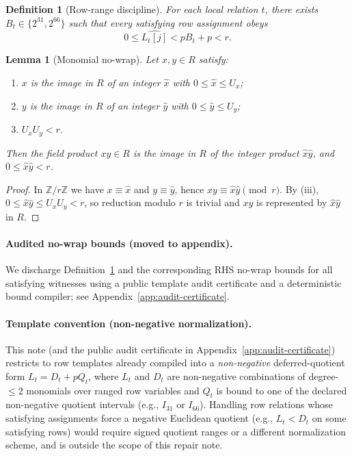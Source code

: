 ﻿\documentclass[11pt]{article}
\newtheorem{lemma}[theorem]{Lemma}
\newtheorem{definition}[theorem]{Definition}
\newcommand{\Z}{\mathbb{Z}}
\newcommand{\wt}[1]{\widehat{#1}}
\begin{document}
\begin{definition}[Row-range discipline]
\label{def:row-range-discipline}
For each local relation \(t\), there exists \(B_t\in\{2^{31},2^{66}\}\) such that
every satisfying row assignment obeys
\[
0 \le \wt{L_t[j]} < pB_t + p < r.
\]
\end{definition}

\begin{lemma}[Monomial no-wrap]
\label{lem:monomial-nowrap}
Let \(x,y\in R\) satisfy:
\begin{enumerate}[label=(\roman*),leftmargin=2em]
    \item \(x\) is the image in \(R\) of an integer \(\wt{x}\) with
    \(0\le \wt{x}\le U_x\);
    \item \(y\) is the image in \(R\) of an integer \(\wt{y}\) with
    \(0\le \wt{y}\le U_y\);
    \item \(U_xU_y<r\).
\end{enumerate}
Then the field product \(xy\in R\) is the image in \(R\) of the integer product
\(\wt{x}\wt{y}\), and \(0\le \wt{x}\wt{y}<r\).
\end{lemma}

\begin{proof}
In \(\Z/r\Z\) we have \(x\equiv \wt{x}\) and \(y\equiv \wt{y}\), hence
\(xy\equiv \wt{x}\wt{y}\pmod r\). By (iii),
\(0\le \wt{x}\wt{y}\le U_xU_y<r\), so reduction modulo \(r\) is trivial and
\(xy\) is represented by \(\wt{x}\wt{y}\) in \(R\).
\end{proof}

\paragraph{Audited no-wrap bounds (moved to appendix).}
We discharge Definition~\ref{def:row-range-discipline} and the corresponding
RHS no-wrap bounds for all satisfying witnesses using a public template audit
certificate and a deterministic bound compiler; see
Appendix~\ref{app:audit-certificate}.

\paragraph{Template convention (non-negative normalization).}
This note (and the public audit certificate in Appendix~\ref{app:audit-certificate})
restricts to row templates already compiled into a \emph{non-negative} deferred-quotient
form \(L_t = D_t + pQ_t\), where \(L_t\) and \(D_t\) are non-negative combinations
of degree-\(\le 2\) monomials over ranged row variables and \(Q_t\) is bound to one
of the declared non-negative quotient intervals (e.g., \(I_{31}\) or \(I_{66}\)).
Handling row relations whose satisfying assignments force a negative Euclidean
quotient (e.g., \(L_t < D_t\) on some satisfying rows) would require signed quotient
ranges or a different normalization scheme, and is outside the scope of this
repair note.
\end{document}
